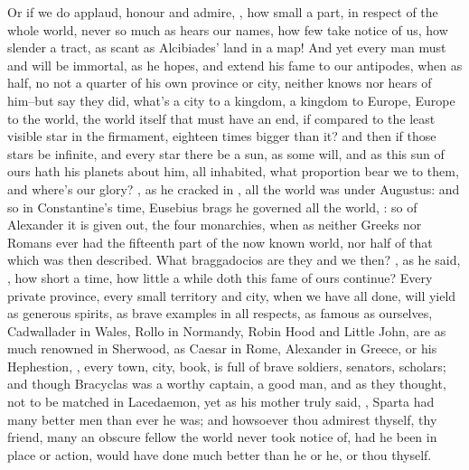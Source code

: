 Or if we do applaud, honour and admire, , how small a part, in
respect of the whole world, never so much as hears our names, how few take
notice of us, how slender a tract, as scant as Alcibiades' land in a map! And
yet every man must and will be immortal, as he hopes, and extend his fame to
our antipodes, when as half, no not a quarter of his own province or city,
neither knows nor hears of him--but say they did, what's a city to a kingdom, a
kingdom to Europe, Europe to the world, the world itself that must have an end,
if compared to the least visible star in the firmament, eighteen times bigger
than it? and then if those stars be infinite, and every star there be a sun, as
some will, and as this sun of ours hath his planets about him, all inhabited,
what proportion bear we to them, and where's our glory? , as he cracked in \Petronius, all the world was under
Augustus: and so in Constantine's time, Eusebius brags he governed all the
world, : so of Alexander it is given out, the four
monarchies, \etc{} when as neither Greeks nor Romans ever had the fifteenth
part of the now known world, nor half of that which was then described. What
braggadocios are they and we then? , as
he said, ,
how short a time, how little a while doth this fame of ours continue? Every
private province, every small territory and city, when we have all done, will
yield as generous spirits, as brave examples in all respects, as famous as
ourselves, Cadwallader in Wales, Rollo in Normandy, Robin Hood and Little John,
are as much renowned in Sherwood, as Caesar in Rome, Alexander in Greece, or
his Hephestion, , every town, city, book, is full of brave
soldiers, senators, scholars; and though Bracyclas was a
worthy captain, a good man, and as they thought, not to be matched in
Lacedaemon, yet as his mother truly said, , Sparta had many better men than ever he was; and howsoever thou
admirest thyself, thy friend, many an obscure fellow the world never took
notice of, had he been in place or action, would have done much better than he
or he, or thou thyself.

